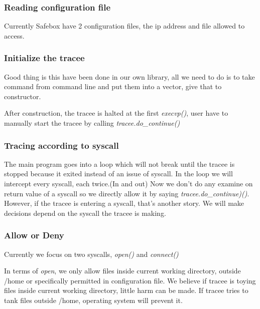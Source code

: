 \documentclass[conference,compsoc]{IEEEtran}
\begin{document}
		\subsubsection{Reading configuration file}
			Currently Safebox have 2 configuration files, the ip address and file allowed to access.
		\subsubsection{Initialize the tracee}
			\par
				Good thing is this have been done in our own library, all we need to do is to take command from command line and put them into a vector, give that to constructor. 
			\par
				After construction, the tracee is halted at the first \emph{execvp()}, user have to manually start the tracee by calling \emph{tracee.do\_continue()}

		\subsubsection{Tracing according to syscall}
			\par
				The main program goes into a loop which will not break until the tracee is stopped because it exited instead of an issue of syscall.
				In the loop we will intercept every syscall, each twice.(In and out)
				Now we don't do any examine on return value of a syscall so we directly allow it by saying \emph{tracee.do\_continue)()}.
				However, if the tracee is entering a syscall, that's another story.
				We will make decisions depend on the syscall the tracee is making.
		\subsubsection{Allow or Deny}
			\par
				Currently we focus on two syscalls, \emph{open()} and \emph{connect()}
			\par
				In terms of \emph{open}, we only allow files inside current working directory, outside /home or specifically permitted in configuration file.
				We believe if tracee is toying files inside current working directory, little harm can be made.
				If tracee tries to tank files outside /home, operating system will prevent it.
				
\end{document}
